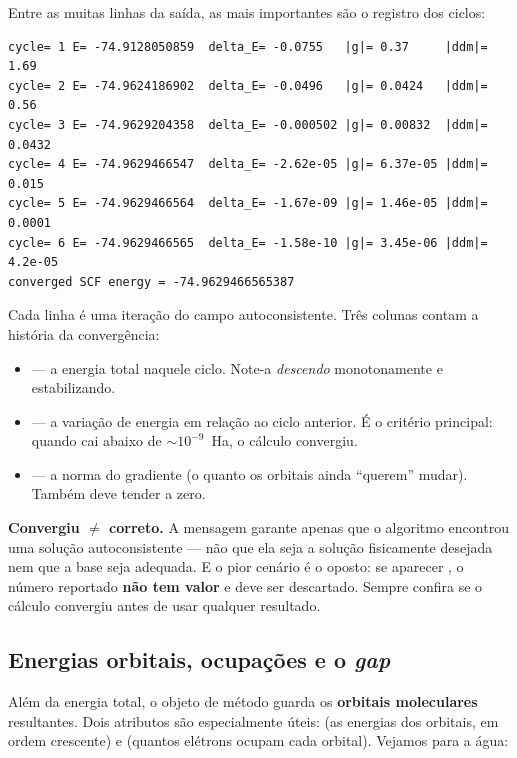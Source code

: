 \noindent
Entre as muitas linhas da saída, as mais importantes são o registro dos ciclos:

\begin{lstlisting}[style=console]
cycle= 1 E= -74.9128050859  delta_E= -0.0755   |g|= 0.37     |ddm|= 1.69
cycle= 2 E= -74.9624186902  delta_E= -0.0496   |g|= 0.0424   |ddm|= 0.56
cycle= 3 E= -74.9629204358  delta_E= -0.000502 |g|= 0.00832  |ddm|= 0.0432
cycle= 4 E= -74.9629466547  delta_E= -2.62e-05 |g|= 6.37e-05 |ddm|= 0.015
cycle= 5 E= -74.9629466564  delta_E= -1.67e-09 |g|= 1.46e-05 |ddm|= 0.0001
cycle= 6 E= -74.9629466565  delta_E= -1.58e-10 |g|= 3.45e-06 |ddm|= 4.2e-05
converged SCF energy = -74.9629466565387
\end{lstlisting}

\noindent
Cada linha é uma iteração do campo autoconsistente. Três colunas contam a
história da convergência:

\begin{itemize}[leftmargin=*]
  \item {} --- a energia total naquele ciclo. Note-a \emph{descendo}
        monotonamente e estabilizando.
  \item {} --- a variação de energia em relação ao ciclo anterior. É o
        critério principal: quando cai abaixo de $\sim 10^{-9}$~Ha, o cálculo
        convergiu.
  \item {} --- a norma do gradiente (o quanto os orbitais ainda ``querem''
        mudar). Também deve tender a zero.
\end{itemize}

\begin{caixaatencao}
\textbf{Convergiu $\neq$ correto.} A mensagem  garante
apenas que o algoritmo encontrou uma solução autoconsistente --- não que ela seja
a solução fisicamente desejada nem que a base seja adequada. E o pior cenário é o
oposto: se aparecer , o número reportado
\textbf{não tem valor} e deve ser descartado. Sempre confira se o cálculo
convergiu antes de usar qualquer resultado.
\end{caixaatencao}

\subsection{Energias orbitais, ocupações e o \emph{gap}}

Além da energia total, o objeto de método guarda os \textbf{orbitais moleculares}
resultantes. Dois atributos são especialmente úteis:  (as
energias dos orbitais, em ordem crescente) e  (quantos elétrons
ocupam cada orbital). Vejamos para a água:

